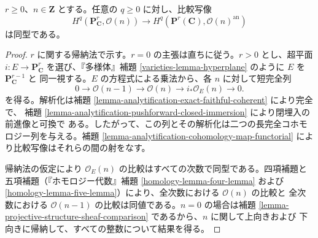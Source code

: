 \begin{lemma}
\label{lemma-projective-twist-comparison}
$r \geq 0$、$n \in \mathbf Z$ とする。任意の $q \geq 0$ に対し、比較写像
$$
H^q(\mathbf P^r_{\mathbf C},\mathcal O(n))
\longrightarrow
H^q(\mathbf P^r(\mathbf C),\mathcal O(n)^{\mathrm{an}})
$$
は同型である。
\end{lemma}

\begin{proof}
$r$ に関する帰納法で示す。$r=0$ の主張は直ちに従う。$r>0$ とし、超平面
$i:E\longrightarrow\mathbf P^r_{\mathbf C}$ を選び、『多様体』補題
\ref{varieties-lemma-hyperplane} のように $E$ を $\mathbf P^{r-1}_{\mathbf C}$ と
同一視する。$E$ の方程式による乗法から、各 $n$ に対して短完全列
$$
0\longrightarrow\mathcal O(n-1)\longrightarrow\mathcal O(n)
\longrightarrow i_*\mathcal O_E(n)\longrightarrow0.
$$
を得る。解析化は補題 \ref{lemma-analytification-exact-faithful-coherent} により完全で、
補題 \ref{lemma-analytification-pushforward-closed-immersion} により閉埋入の前進像と可換で
ある。したがって、この列とその解析化は二つの長完全コホモロジー列を与える。補題
\ref{lemma-analytification-cohomology-map-functorial} により比較写像はそれらの間の射をなす。

帰納法の仮定により $\mathcal O_E(n)$ の比較はすべての次数で同型である。四項補題と
五項補題（『ホモロジー代数』補題 \ref{homology-lemma-four-lemma} および
\ref{homology-lemma-five-lemma}）により、全次数における $\mathcal O(n)$ の比較と
全次数における $\mathcal O(n-1)$ の比較は同値である。$n=0$ の場合は補題
\ref{lemma-projective-structure-sheaf-comparison} であるから、$n$ に関して上向きおよび
下向きに帰納して、すべての整数について結果を得る。
\end{proof}

